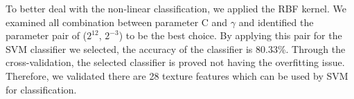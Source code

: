 To better deal with the non-linear classification, we applied the RBF kernel. We examined all combination between parameter C and $\gamma$ and identified the parameter pair of ($2^{12}$, $2^{-3}$) to be the best choice. By applying this pair for the SVM classifier we selected, the accuracy of the classifier is 80.33\%. Through the cross-validation, the selected classifier is proved not having the overfitting issue. Therefore, we validated there are 28 texture features which can be used by SVM for classification.
